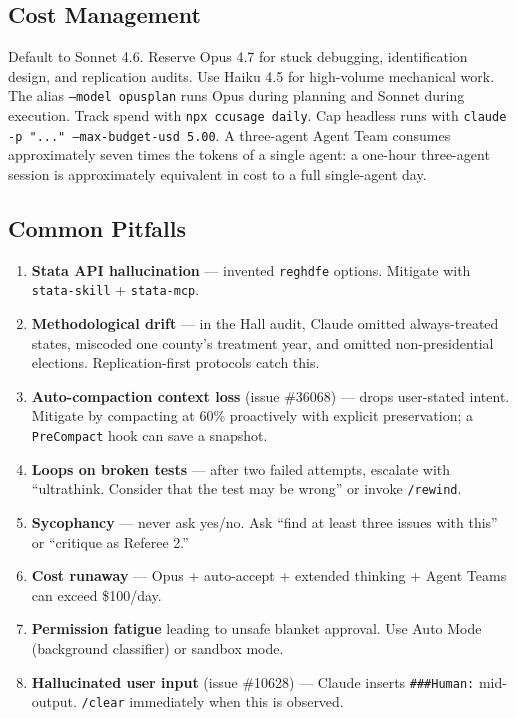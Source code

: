 \documentclass[11pt]{article}
\begin{document}
\subsection{Cost Management}

Default to Sonnet 4.6. Reserve Opus 4.7 for stuck debugging, identification design, and replication audits. Use Haiku 4.5 for high-volume mechanical work. The alias \texttt{--model opusplan} runs Opus during planning and Sonnet during execution. Track spend with \texttt{npx ccusage daily}. Cap headless runs with \texttt{claude -p "..." --max-budget-usd 5.00}. A three-agent Agent Team consumes approximately seven times the tokens of a single agent: a one-hour three-agent session is approximately equivalent in cost to a full single-agent day.

\subsection{Common Pitfalls}

\begin{enumerate}[leftmargin=*,nosep]
    \item \textbf{Stata API hallucination} --- invented \texttt{reghdfe} options. Mitigate with \texttt{stata-skill} + \texttt{stata-mcp}.
    \item \textbf{Methodological drift} --- in the Hall audit, Claude omitted always-treated states, miscoded one county's treatment year, and omitted non-presidential elections. Replication-first protocols catch this.
    \item \textbf{Auto-compaction context loss} (issue \#36068) --- drops user-stated intent. Mitigate by compacting at 60\% proactively with explicit preservation; a \texttt{PreCompact} hook can save a snapshot.
    \item \textbf{Loops on broken tests} --- after two failed attempts, escalate with ``ultrathink. Consider that the test may be wrong'' or invoke \texttt{/rewind}.
    \item \textbf{Sycophancy} --- never ask yes/no. Ask ``find at least three issues with this'' or ``critique as Referee 2.''
    \item \textbf{Cost runaway} --- Opus + auto-accept + extended thinking + Agent Teams can exceed \$100/day.
    \item \textbf{Permission fatigue} leading to unsafe blanket approval. Use Auto Mode (background classifier) or sandbox mode.
    \item \textbf{Hallucinated user input} (issue \#10628) --- Claude inserts \texttt{\#\#\#Human:} mid-output. \texttt{/clear} immediately when this is observed.
\end{enumerate}
\end{document}
